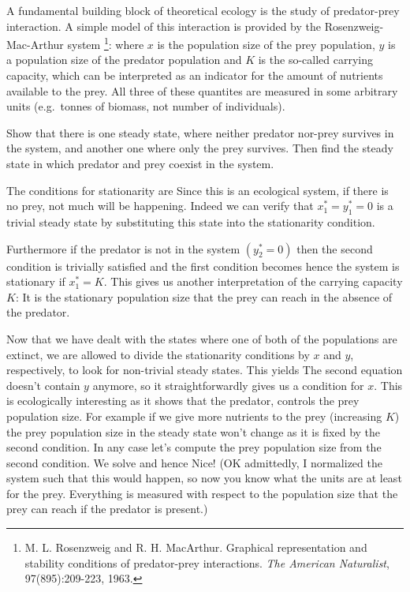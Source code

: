 
A fundamental building block of theoretical ecology is the study of predator-prey interaction. A simple model of this interaction is 
provided by the Rosenzweig-Mac-Arthur system \footnote{M. L. Rosenzweig and R. H. MacArthur. Graphical representation and stability conditions of predator-prey interactions. \textit{The American Naturalist}, 97(895):209-223, 1963.}:
where $x$ is the population size of the prey population, $y$ is a population size of the predator population and $K$ is the so-called 
carrying capacity, which can be interpreted as an indicator for the amount of nutrients available to the prey. All three of these quantites are measured in some arbitrary units (e.g.~tonnes of biomass, not number of individuals).

\subquestion 
Show that there is one steady state, where neither predator nor-prey survives in the system, and another one where only the prey survives. Then find the steady state in which predator and prey coexist in the system.  

\solution 
The conditions for stationarity are 
Since this is an ecological system, if there is no prey, not much will be happening. Indeed we can verify that $x_1^*=y_1^*=0$ is a trivial steady state by substituting this state into the stationarity condition.

Furthermore if the predator is not in the system $(y_2^*=0)$ then the second condition is trivially satisfied and the first condition becomes 
hence the system is stationary if $x_1^*=K$. This gives us another interpretation of the carrying capacity $K$: It is the stationary population size that the prey can reach in the absence of the predator.

Now that we have dealt with the states where one of both of the populations are extinct, we are allowed to divide the stationarity conditions by $x$ and $y$, respectively, to look for non-trivial steady states. This yields
The second equation doesn't contain $y$ anymore, so it straightforwardly gives us a condition for $x$. This is ecologically interesting as it shows that the predator, controls the prey population size. For example if we give more nutrients to the prey (increasing $K$) the prey population size in the steady state won't change as it is fixed by the second condition. In any case let's compute the prey population size from the second condition. We solve
and hence 
Nice! (OK admittedly, I normalized the system such that this would happen, so now you know what the units are at least for the prey. Everything is measured with respect to the population size that the prey can reach if the predator is present.)

